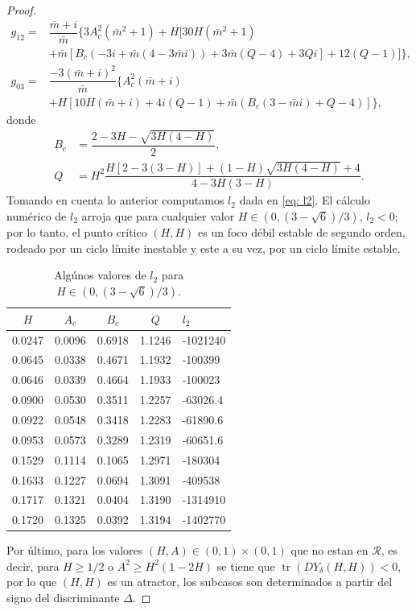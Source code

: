 \documentclass[]{article}
\theoremstyle{remark}
\begin{document}
\begin{proof}
\begin{equation*}
\begin{aligned}
				g_{12} = & \dfrac{\bar{m}+i}{\bar{m}} \{3A_c^2(\bar{m}^2+1) + H[30H(\bar{m}^2+1)\\
				& + \bar{m}[B_c(-3i + \bar{m}(4 - 3\bar{m}i)) + 3\bar{m}(Q-4) + 3Qi] + 12(Q-1)]\}, \\
				g_{03} = & \dfrac{-3(\bar{m}+i)^2}{\bar{m}} \{A_c^2(\bar{m}+i) \\
				& + H\left[10H(\bar{m}+i) + 4i(Q-1) + \bar{m}(B_c(3 - \bar{m}i) + Q -4)\right]\},
			\end{aligned}
		\end{equation*}
		donde
		\begin{equation*}
			\begin{aligned}
				B_c &= \dfrac{2-3H - \sqrt{3H(4 - H)}}{2}, \\
				Q &= H^2 \dfrac{H[2-3(3-H)]+(1-H)\sqrt{3H(4-H)}+4}{4-3H(3-H)}.
			\end{aligned}
		\end{equation*}
		Tomando en cuenta lo anterior computamos $l_2$ dada en \eqref{eq: l2}. El cálculo numérico de $l_2$ arroja que para cualquier valor $H \in \left(0,(3 - \sqrt{6})/3 \right)$, $l_2<0$; por lo tanto, el punto crítico $(H,H)$ es un foco débil estable de segundo orden, rodeado por un ciclo límite inestable y este a su vez, por un ciclo límite estable.
		\begin{table}[H]
			\centering
			\caption{Algúnos valores de $l_2$ para $H \in \left(0,(3 - \sqrt{6})/3 \right)$.}
			\label{tab: ejemplosL2}
			
			\begin{tabular}{ccccl}
				\hline
				$H$ & $A_c$ & $B_c$ & $Q$ & $l_2$ \\
				\hline
				0.0247 & 0.0096 & 0.6918 & 1.1246 & -1021240 \\
				0.0645 & 0.0338 & 0.4671 & 1.1932 & -100399 \\
				0.0646 & 0.0339 & 0.4664 & 1.1933 & -100023 \\
				0.0900 & 0.0530 & 0.3511 & 1.2257 & -63026.4 \\
				0.0922 & 0.0548 & 0.3418 & 1.2283 & -61890.6 \\
				0.0953 & 0.0573 & 0.3289 & 1.2319 & -60651.6 \\
				0.1529 & 0.1114 & 0.1065 & 1.2971 & -180304 \\
				0.1633 & 0.1227 & 0.0694 & 1.3091 & -409538 \\
				0.1717 & 0.1321 & 0.0404 & 1.3190 & -1314910 \\
				0.1720 & 0.1325 & 0.0392 & 1.3194 & -1402770 \\
				\hline
			\end{tabular}
		\end{table}
		
		\noindent Por último, para los valores $(H, A) \in (0, 1) \times (0, 1)$ que no estan en $\mathcal{R}$, es decir, para $H \geq 1/2$ o $A^2 \geq H^2(1-2H)$ se tiene que $\operatorname{tr}(DY_\delta(H,H)) < 0$, por lo que $(H, H)$ es un atractor, los subcasos son determinados a partir del signo del discriminante $\Delta$.
	\end{proof}
	
\end{document}
